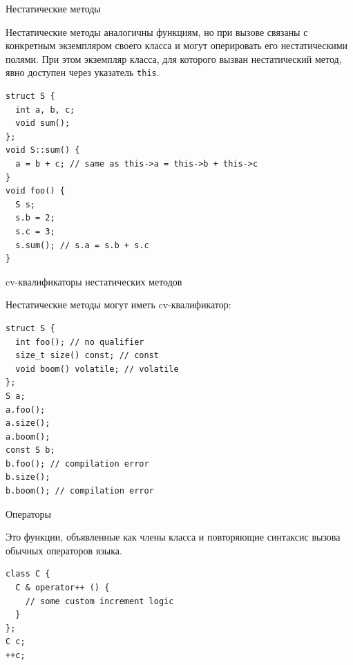 \documentclass[unknownkeysallowed,xcolor=table]{beamer}
\begin{document}
\begin{frame}[fragile]{Нестатические методы}

Нестатические методы аналогичны функциям, но при вызове связаны с конкретным экземпляром своего класса и могут оперировать его нестатическими полями. При этом экземпляр класса, для которого вызван нестатический метод, явно доступен через указатель \lstinline{this}.

\begin{lstlisting}
struct S {
  int a, b, c;
  void sum();
};
void S::sum() {
  a = b + c; // same as this->a = this->b + this->c
}
void foo() {
  S s;
  s.b = 2;
  s.c = 3;
  s.sum(); // s.a = s.b + s.c
}
\end{lstlisting}

\end{frame}

\begin{frame}[fragile]{cv-квалификаторы нестатических методов}

Нестатические методы могут иметь cv-квалификатор:

\vspace{1em}

\begin{lstlisting}
struct S {
  int foo(); // no qualifier
  size_t size() const; // const
  void boom() volatile; // volatile
};
S a;
a.foo();
a.size();
a.boom();
const S b;
b.foo(); // compilation error
b.size();
b.boom(); // compilation error
\end{lstlisting}

\end{frame}

\begin{frame}[fragile]{Операторы}

Это функции, объявленные как члены класса и повторяющие синтаксис вызова обычных операторов языка.

\vspace{1em}

\begin{lstlisting}
class C {
  C & operator++ () {
    // some custom increment logic
  }
};
C c;
++c;
\end{lstlisting}

\end{frame}
\end{document}
